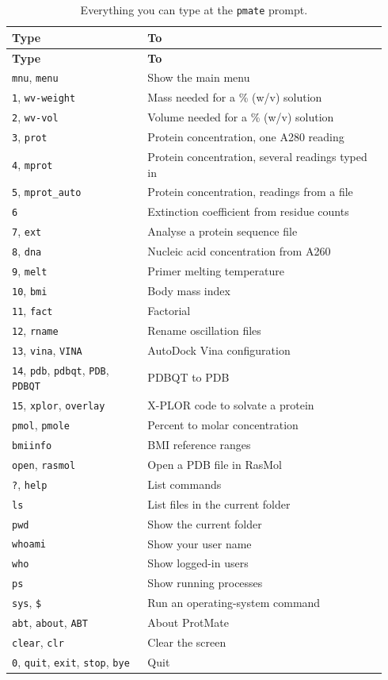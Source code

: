 \documentclass[11pt,a4paper,oneside]{report}
\newcommand{\cmd}[1]{\texttt{#1}}            %
\begin{document}
\begin{longtable}{@{}p{0.34\linewidth}p{0.6\linewidth}@{}}
\caption{Everything you can type at the \cmd{pmate} prompt.}\label{tab:commands}\\
\toprule
\textbf{Type} & \textbf{To} \\ \midrule
\endfirsthead
\toprule
\textbf{Type} & \textbf{To} \\ \midrule
\endhead
\cmd{mnu}, \cmd{menu} & Show the main menu \\
\cmd{1}, \cmd{wv-weight} & Mass needed for a \% (w/v) solution \\
\cmd{2}, \cmd{wv-vol} & Volume needed for a \% (w/v) solution \\
\cmd{3}, \cmd{prot} & Protein concentration, one A280 reading \\
\cmd{4}, \cmd{mprot} & Protein concentration, several readings typed in \\
\cmd{5}, \cmd{mprot\_auto} & Protein concentration, readings from a file \\
\cmd{6} & Extinction coefficient from residue counts \\
\cmd{7}, \cmd{ext} & Analyse a protein sequence file \\
\cmd{8}, \cmd{dna} & Nucleic acid concentration from A260 \\
\cmd{9}, \cmd{melt} & Primer melting temperature \\
\cmd{10}, \cmd{bmi} & Body mass index \\
\cmd{11}, \cmd{fact} & Factorial \\
\cmd{12}, \cmd{rname} & Rename oscillation files \\
\cmd{13}, \cmd{vina}, \cmd{VINA} & AutoDock Vina configuration \\
\cmd{14}, \cmd{pdb}, \cmd{pdbqt}, \cmd{PDB}, \cmd{PDBQT} & PDBQT to PDB \\
\cmd{15}, \cmd{xplor}, \cmd{overlay} & X-PLOR code to solvate a protein \\
\cmd{pmol}, \cmd{pmole} & Percent to molar concentration \\
\cmd{bmiinfo} & BMI reference ranges \\
\cmd{open}, \cmd{rasmol} & Open a PDB file in RasMol \\
\cmd{?}, \cmd{help} & List commands \\
\cmd{ls} & List files in the current folder \\
\cmd{pwd} & Show the current folder \\
\cmd{whoami} & Show your user name \\
\cmd{who} & Show logged-in users \\
\cmd{ps} & Show running processes \\
\cmd{sys}, \cmd{\$} & Run an operating-system command \\
\cmd{abt}, \cmd{about}, \cmd{ABT} & About ProtMate \\
\cmd{clear}, \cmd{clr} & Clear the screen \\
\cmd{0}, \cmd{quit}, \cmd{exit}, \cmd{stop}, \cmd{bye} & Quit \\
\bottomrule
\end{longtable}
\end{document}
